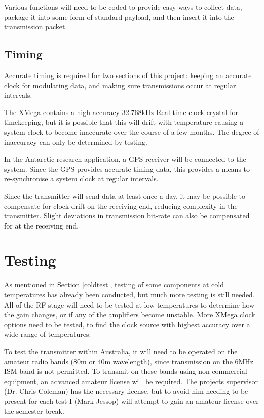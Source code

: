 \documentclass[a4paper,12pt]{article}
\begin{document}
Various functions will need to be coded to provide easy ways to collect data, package it into some form of standard payload, and then insert it into the transmission packet.

\subsection{Timing}
Accurate timing is required for two sections of this project: keeping an accurate clock for modulating data, and making sure transmissions occur at regular intervals.

The XMega contains a high accuracy 32.768kHz Real-time clock crystal for timekeeping, but it is possible that this will drift with temperature causing a system clock to become inaccurate over the course of a few months. The degree of inaccuracy can only be determined by testing.

In the Antarctic research application, a GPS receiver will be connected to the system. Since the GPS provides accurate timing data, this provides a means to re-synchronise a system clock at regular intervals. 

Since the transmitter will send data at least once a day, it may be possible to compensate for clock drift on the receiving end, reducing complexity in the transmitter. Slight deviations in transmission bit-rate can also be compensated for at the receiving end. 

\section{Testing}
As mentioned in Section \ref{coldtest}, testing of some components at cold temperatures has already been conducted, but much more testing is still needed. All of the RF stage will need to be tested at low temperatures to determine how the gain changes, or if any of the amplifiers become unstable. More XMega clock options need to be tested, to find the clock source with highest accuracy over a wide range of temperatures. 

To test the transmitter within Australia, it will need to be operated on the amateur radio bands (80m or 40m wavelength), since transmission on the 6MHz ISM band is not permitted. To transmit on these bands using non-commercial equipment, an advanced amateur license will be required. The projects supervisor (Dr. Chris Coleman) has the necessary license, but to avoid him needing to be present for each test I (Mark Jessop) will attempt to gain an amateur license over the semester break.
\end{document}
